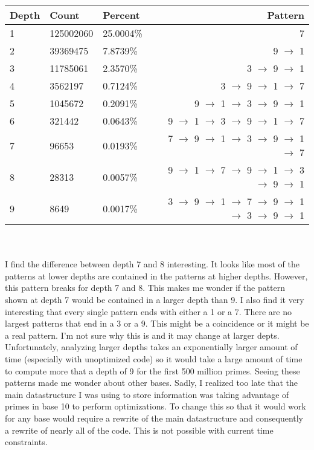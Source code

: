 \documentclass[13pt]{article}
\begin{document}
\begin{tabular} { l l l r }
Depth & Count      & Percent   & Pattern\\
\hline
    1 &  125002060 &  25.0004\% & 7\\
    2 &   39369475 &   7.8739\% & 9 $\rightarrow$ 1\\
    3 &   11785061 &   2.3570\% & 3 $\rightarrow$ 9 $\rightarrow$ 1\\
    4 &    3562197 &   0.7124\% & 3 $\rightarrow$ 9 $\rightarrow$ 1 $\rightarrow$ 7\\
    5 &    1045672 &   0.2091\% & 9 $\rightarrow$ 1 $\rightarrow$ 3 $\rightarrow$ 9 $\rightarrow$ 1\\
    6 &     321442 &   0.0643\% & 9 $\rightarrow$ 1 $\rightarrow$ 3 $\rightarrow$ 9 $\rightarrow$ 1 $\rightarrow$ 7\\
    7 &      96653 &   0.0193\% & 7 $\rightarrow$ 9 $\rightarrow$ 1 $\rightarrow$ 3 $\rightarrow$ 9 $\rightarrow$ 1 $\rightarrow$ 7\\
    8 &      28313 &   0.0057\% & 9 $\rightarrow$ 1 $\rightarrow$ 7 $\rightarrow$ 9 $\rightarrow$ 1 $\rightarrow$ 3 $\rightarrow$ 9 $\rightarrow$ 1\\
    9 &       8649 &   0.0017\% & 3 $\rightarrow$ 9 $\rightarrow$ 1 $\rightarrow$ 7 $\rightarrow$ 9 $\rightarrow$ 1 $\rightarrow$ 3 $\rightarrow$ 9 $\rightarrow$ 1\\
\end{tabular}\\\\
I find the difference between depth 7 and 8 interesting. It looks like most of the patterns at lower depths are contained in the patterns at higher depths. However, this pattern breaks for depth 7 and 8. This makes me wonder if the pattern shown at depth 7 would be contained in a larger depth than 9. I also find it very interesting that every single pattern ends with either a 1 or a 7. There are no largest patterns that end in a 3 or a 9. This might be a coincidence or it might be a real pattern. I'm not sure why this is and it may change at larger depts. Unfortunately, analyzing larger depths takes an exponentially larger amount of time (especially with unoptimized code) so it would take a large amount of time to compute more that a depth of 9 for the first 500 million primes. Seeing these patterns made me wonder about other bases. Sadly, I realized too late that the main datastructure I was using to store information was taking advantage of primes in base 10 to perform optimizations. To change this so that it would work for any base would require a rewrite of the main datastructure and consequently a rewrite of nearly all of the code. This is not possible with current time constraints. \\\\
\end{document}
